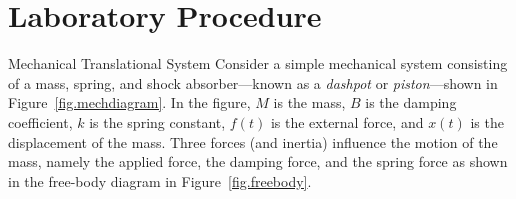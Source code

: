 \section{Laboratory Procedure}

\begin{casestudy}{Mechanical Translational System} \label{cs.mechtrans}
Consider a simple mechanical system consisting of a mass, spring, and shock absorber---known as a \textit{dashpot} or \textit{piston}---shown in Figure~\ref{fig.mechdiagram}.  In the figure, $M$ is the mass, $B$ is the damping coefficient, $k$ is the spring constant, $f(t)$ is the external force, and $x(t)$ is the displacement of the mass.  Three forces (and inertia) influence the motion of the mass, namely the applied force, the damping force, and the spring force as shown in the free-body diagram in Figure~\ref{fig.freebody}.

\newsavebox{\tempbigA}
\newsavebox{\tempsmallA}
\begin{figure}[bht]
    \centering
    \newlength{\subfigoffsetA}
    \setlength{\subfigoffsetA}{0.5\ht\tempbigA}
    \addtolength{\subfigoffsetA}{-0.5\ht\tempsmallA}
    \hfill
    \caption{}
\end{figure}


\end{casestudy}
